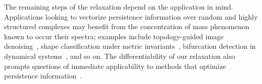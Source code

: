 \documentclass[10pt]{article}
\numberwithin{equation}{section}
\newcommand*\boxAppOne[2][Application \#1: Vectorizing persistence information]{%
  \sbox{\mysaveboxM}{#2}%
  \sbox{\mysaveboxT}{\fcolorbox{black}{white}{#1}}%
  \sbox{\mysaveboxM}{%
    \parbox[t][\ht\mysaveboxM+.5\ht\mysaveboxT+.5\dp\mysaveboxT][b]{\wd\mysaveboxM}{#2}%
  }%
  \sbox{\mysaveboxM}{%
    \fcolorbox{black}{shadecolor}{%
      \makebox[\linewidth-1em]{\usebox{\mysaveboxM}}%
    }%
  }%
  \usebox{\mysaveboxM}%
  \makebox[15pt][r]{%
    \makebox[\wd\mysaveboxM][l]{%
      \raisebox{\ht\mysaveboxM-0.5\ht\mysaveboxT+0.5\dp\mysaveboxT-0.5\fboxrule}{\usebox{\mysaveboxT}}%
    }%
  }%
}
\newcommand{\+}{%
	\raisebox{0.18ex}{\scaleobj{0.55}{+}}
}
\theoremstyle{definition}
\theoremstyle{definition}
\begin{document}
\noindent The remaining steps of the relaxation depend on the application in mind. 
Applications looking to vectorize persistence information over random and highly structured complexes may benefit from the concentration of mass phenomenon known to occur their spectra; examples include topology-guided image denoising~\cite{pun2018persistent}, shape classification under metric invariants~\cite{chazal2009gromov}, bifurcation detection in dynamical systems~\cite{perea2022approximating}, and so on. 
The differentiability of our relaxation also prompts questions of immediate applicability to methods that optimize persistence information~\cite{nigmetov2022topological}. 

\noindent 
\end{document}
